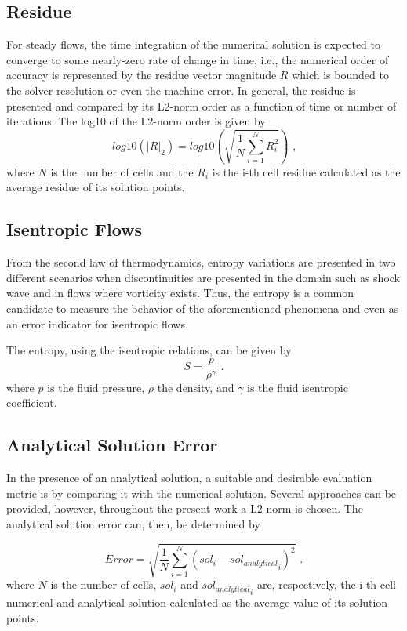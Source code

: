 \subsection{Residue}
For steady flows, the time integration of the numerical solution is expected to converge to some nearly-zero rate of change in time, i.e., the numerical order of accuracy is represented by the residue vector magnitude $R$ which is bounded to the solver resolution or even the machine error. In general, the residue is presented and compared by its L2-norm order as a function of time or number of iterations. The log10 of the L2-norm order is given by
%
\begin{equation}
    \label{eq_residue_l2_norm}
	log10(|R|_2) = log10\left(\sqrt{ \frac{1}{N}\sum_{i=1}^{N} R_{i}^2} \right)
    \mbox{ ,}
\end{equation}
where $N$ is the number of cells and the $R_i$ is the i-th cell residue calculated as the average residue of its solution points.

\subsection{Isentropic Flows}
From the second law of thermodynamics, entropy variations are presented in two different scenarios when discontinuities are presented in the domain such as shock wave and in flows where vorticity exists. Thus, the entropy is a common candidate to measure the behavior of the aforementioned phenomena and even as an error indicator for isentropic flows.

The entropy, using the isentropic relations, can be given by
\begin{equation}
    \label{eq_entropy}
	S = \frac{p}{\rho^{\gamma}}
    \mbox{ .}
\end{equation}
where $p$ is the fluid pressure, $\rho$ the density, and $\gamma$ is the fluid isentropic coefficient.

\subsection{Analytical Solution Error}
In the presence of an analytical solution, a suitable and desirable evaluation metric is by comparing it with the numerical solution. Several approaches can be provided, however, throughout the present work a L2-norm is chosen. The analytical solution error can, then, be determined by

\begin{equation}
    \label{eq_analytical_l2_norm}
	Error = \sqrt{ \frac{1}{N}\sum_{i=1}^{N} {(sol_i - {sol_{analytical}}_i)}^2}
    \mbox{ .}
\end{equation}
where $N$ is the number of cells, $sol_i$ and ${sol_{analytical}}_i$ are, respectively, the i-th cell numerical and analytical solution calculated as the average value of its solution points.
